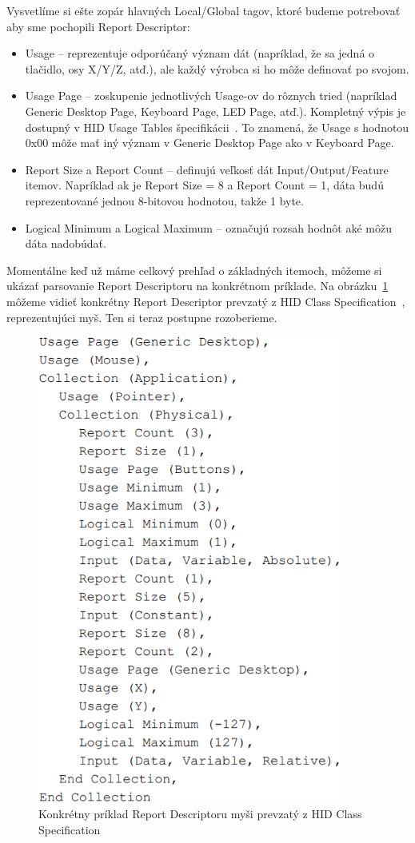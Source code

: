 Vysvetlíme si ešte zopár hlavných Local/Global tagov, ktoré budeme potrebovať aby sme pochopili Report Descriptor:
\begin{itemize}
\item Usage -- reprezentuje odporúčaný význam dát (napríklad, že sa jedná o tlačidlo, osy X/Y/Z, atď.), ale každý výrobca si ho môže definovať po svojom.
\item Usage Page -- zoskupenie jednotlivých Usage-ov do rôznych tried (napríklad Generic Desktop Page, Keyboard Page, LED Page, atď.). Kompletný výpis je dostupný v HID Usage Tables špecifikácii~\cite{usage_pages}. To znamená, že Usage s hodnotou 0x00 môže mať iný význam v Generic Desktop Page ako v Keyboard Page.
\item Report Size a Report Count -- definujú veľkosť dát Input/Output/Feature itemov. Napríklad ak je Report Size = 8 a Report Count = 1, dáta budú reprezentované jednou 8-bitovou hodnotou, takže 1 byte.
\item Logical Minimum a Logical Maximum -- označujú rozsah hodnôt aké môžu dáta nadobúdať.
\end{itemize}

Momentálne keď už máme celkový prehľad o základných itemoch, môžeme si ukázať parsovanie Report Descriptoru na konkrétnom príklade. Na obrázku~\ref{obr:kap3:full_report_desc} môžeme vidieť konkrétny Report Descriptor prevzatý z HID Class Specification~\cite{report_desc_mouse}, reprezentujúci myš. Ten si teraz postupne rozoberieme.

\begin{figure}[!htb]
	\centering
	\includegraphics[width=10cm]{img/kap03_full_report_desc}
	\caption{Konkrétny príklad Report Descriptoru myši prevzatý z HID Class Specification~\cite{report_desc_mouse}}
	\label{obr:kap3:full_report_desc}
\end{figure}


